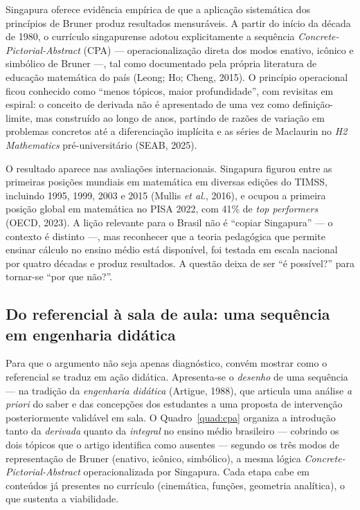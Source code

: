 \documentclass[12pt,a4paper,oneside]{article}
\begin{document}
Singapura oferece evidência empírica de que a aplicação sistemática dos
princípios de Bruner produz resultados mensuráveis. A partir do início
da década de 1980, o currículo singapurense adotou explicitamente a
sequência \emph{Concrete-Pictorial-Abstract} (CPA) --- operacionalização
direta dos modos enativo, icônico e simbólico de Bruner ---, tal como
documentado pela própria literatura de educação matemática do país
(Leong; Ho; Cheng, 2015). O princípio operacional ficou conhecido como
``menos tópicos, maior profundidade'', com revisitas em espiral: o
conceito de derivada não é apresentado de uma vez como definição-limite,
mas construído ao longo de anos, partindo de razões de variação em
problemas concretos até a diferenciação implícita e as séries de
Maclaurin no \emph{H2 Mathematics} pré-universitário (SEAB, 2025).

O resultado aparece nas avaliações internacionais. Singapura figurou
entre as primeiras posições mundiais em matemática em diversas edições do
TIMSS, incluindo 1995, 1999, 2003 e 2015 (Mullis \emph{et al.}, 2016), e
ocupou a primeira posição global em matemática no PISA 2022, com 41\% de
\emph{top performers} (OECD, 2023). A lição relevante para o Brasil não é
``copiar Singapura'' --- o contexto é distinto ---, mas reconhecer que a
teoria pedagógica que permite ensinar cálculo no ensino médio está
disponível, foi testada em escala nacional por quatro décadas e produz
resultados. A questão deixa de ser ``é possível?'' para tornar-se ``por
que não?''.

\subsection{Do referencial à sala de aula: uma sequência em engenharia didática}
\label{sec:sequencia}

Para que o argumento não seja apenas diagnóstico, convém mostrar como o
referencial se traduz em ação didática. Apresenta-se o \emph{desenho} de
uma sequência --- na tradição da \emph{engenharia didática} (Artigue,
1988), que articula uma análise \emph{a priori} do saber e das
concepções dos estudantes a uma proposta de intervenção posteriormente
validável em sala. O Quadro~\ref{quad:cpa} organiza a introdução tanto da
\emph{derivada} quanto da \emph{integral} no ensino médio brasileiro ---
cobrindo os dois tópicos que o artigo identifica como ausentes --- segundo
os três modos de representação de Bruner (enativo, icônico, simbólico), a
mesma lógica \emph{Concrete-Pictorial-Abstract} operacionalizada por
Singapura. Cada etapa cabe em conteúdos já presentes no currículo
(cinemática, funções, geometria analítica), o que sustenta a viabilidade.
\end{document}
